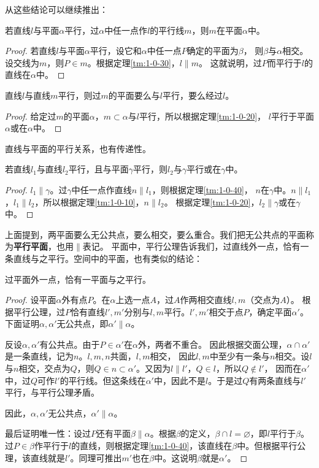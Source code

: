 \documentclass[12pt,UTF8,fontset=none]{ctexbook}
\begin{document}
从这些结论可以继续推出：
\begin{tm}\label{tm:1-0-40}
    若直线$l$与平面$\alpha$平行，过$\alpha$中任一点作$l$的平行线$m$，则$m$在平面$\alpha$中。
\end{tm}
\begin{proof}
    若直线$l$与平面$\alpha$平行，设它和$\alpha$中任一点$P$确定的平面为$\beta$，
    则$\beta$与$\alpha$相交。设交线为$m$，则$P\in m$。根据定理\ref{tm:1-0-30}，$l\parallel m$。
    这就说明，过$P$而平行于$l$的直线在$\alpha$中。
\end{proof}
\begin{tm}\label{tm:1-0-41}
    直线$l$与直线$m$平行，则过$m$的平面要么与$l$平行，要么经过$l$。
\end{tm}
\begin{proof}
    给定过$m$的平面$\alpha$，$m\subset \alpha$与$l$平行，所以根据定理\ref{tm:1-0-20}，
    $l$平行于平面$\alpha$或在$\alpha$中。
\end{proof}

直线与平面的平行关系，也有传递性。
\begin{tm}
    若直线$l_1$与直线$l_2$平行，且与平面$\gamma$平行，则$l_2$与$\gamma$平行或在$\gamma$中。
\end{tm}
\begin{proof}
    $l_1\parallel \gamma$。过$\gamma$中任一点作直线$n\parallel l_1$，则根据定理\ref{tm:1-0-40}，
    $n$在$\gamma$中。$n\parallel l_1$，$l_1\parallel l_2$，所以根据定理\ref{tm:1-0-10}，$n\parallel l_2$。
    根据定理\ref{tm:1-0-20}，$l_2\parallel \gamma$或在$\gamma$中。
\end{proof}

上面提到，两平面要么无公共点，要么相交，要么重合。我们把无公共点的平面称为\textbf{平行平面}，也用$\parallel$表记。
平面中，平行公理告诉我们，过直线外一点，恰有一条直线与之平行。空间中的平面，也有类似的结论：
\begin{tm}\label{tm:1-0-50}
    过平面外一点，恰有一平面与之平行。
\end{tm}
\begin{proof}
    设平面$\alpha$外有点$P$。在$\alpha$上选一点$A$，过$A$作两相交直线$l,m$（交点为$A$）。
    根据平行公理，过$P$恰有直线$l', m'$分别与$l,m$平行。$l',m'$相交于点$P$，确定平面$\alpha'$。
    下面证明$\alpha,\alpha'$无公共点，即$\alpha'\parallel\alpha$。

    反设$\alpha,\alpha'$有公共点。由于$P\in\alpha'$在$\alpha$外，两者不重合。
    因此根据交面公理，$\alpha \cap \alpha'$是一条直线，记为$n$。$l,m,n$共面，$l,m$相交，
    因此$l,m$中至少有一条与$n$相交。设$l$与$n$相交，交点为$Q$，则$Q\in n\subset\alpha'$。又因为$l\parallel l'$，$Q\in l$，所以$Q\notin l'$，
    因而在$\alpha'$中，过$Q$可作$l'$的平行线。但这条线在$\alpha'$中，因此不是$l$。于是过$Q$有两条直线与$l'$平行，与平行公理矛盾。
        
    因此，$\alpha,\alpha'$无公共点，$\alpha'\parallel\alpha$。

    最后证明唯一性：设过$P$还有平面$\beta \parallel \alpha$。根据$\beta$的定义，$\beta\cap l=\varnothing$，即$l$平行于$\beta$。过$P\in\beta$作平行于$l$的直线，则根据定理\ref{tm:1-0-40}，该直线在$\beta$中。但根据平行公理，该直线就是$l'$。同理可推出$m'$也在$\beta$中。这说明$\beta$就是$\alpha'$。
\end{proof}
\end{document}
